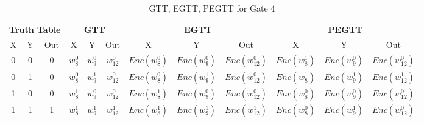 \documentclass[times]{article}
\begin{document}
	\begin{table}
		\centering
		\caption{GTT, EGTT, PEGTT for Gate 4}
		\label{tab:gtt4}
		\begin{adjustbox}{width=1\textwidth}
		\begin{tabular}{|c|c|c||c|c|c||c|c|c||c|c|c|}
			\hline
			\multicolumn{3}{|c||}{Truth Table} 		& 
				\multicolumn{3}{|c||}{GTT}			& 
					\multicolumn{3}{|c||}{EGTT} 		& 
						\multicolumn{3}{|c|}{PEGTT} \\
			\hline
			\hline
			X & Y & Out	& 
				X & Y & Out	& 
					X & Y & Out	& 
						X & Y & Out	\\
			\hline
			0 & 0 & 0 	&
				$w_{8}^0$	& $w_{9}^0$	& $w_{12}^0$	& 
					$Enc(w_{8}^0)$	& $Enc(w_{9}^0)$	& $Enc(w_{12}^0)$ &
						$Enc(w_{8}^1)$	& $Enc(w_{9}^0)$	& $Enc(w_{12}^0)$ \\
			\hline
			0 & 1 & 0 	&
				$w_{8}^0$	& $w_{9}^1$	& $w_{12}^0$	& 
					$Enc(w_{8}^0)$	& $Enc(w_{9}^1)$	& $Enc(w_{12}^0)$ &
						$Enc(w_{8}^1)$	& $Enc(w_{9}^1)$	& $Enc(w_{12}^1)$ \\
			\hline
			1 & 0 & 0 	&
				$w_{8}^1$	& $w_{9}^0$	& $w_{12}^0$	& 
					$Enc(w_{8}^1)$	& $Enc(w_{9}^0)$	& $Enc(w_{12}^0)$ &
						$Enc(w_{8}^0)$	& $Enc(w_{9}^0)$	& $Enc(w_{12}^0)$ \\
			\hline
			1 & 1 & 1 	&
				$w_{8}^1$	& $w_{9}^1$	& $w_{12}^1$	& 
					$Enc(w_{8}^1)$	& $Enc(w_{9}^1)$	& $Enc(w_{12}^1)$ &
						$Enc(w_{8}^0)$	& $Enc(w_{9}^1)$	& $Enc(w_{12}^0)$ \\
			\hline
		\end{tabular}
		\end{adjustbox}
	\end{table}
\end{document}
